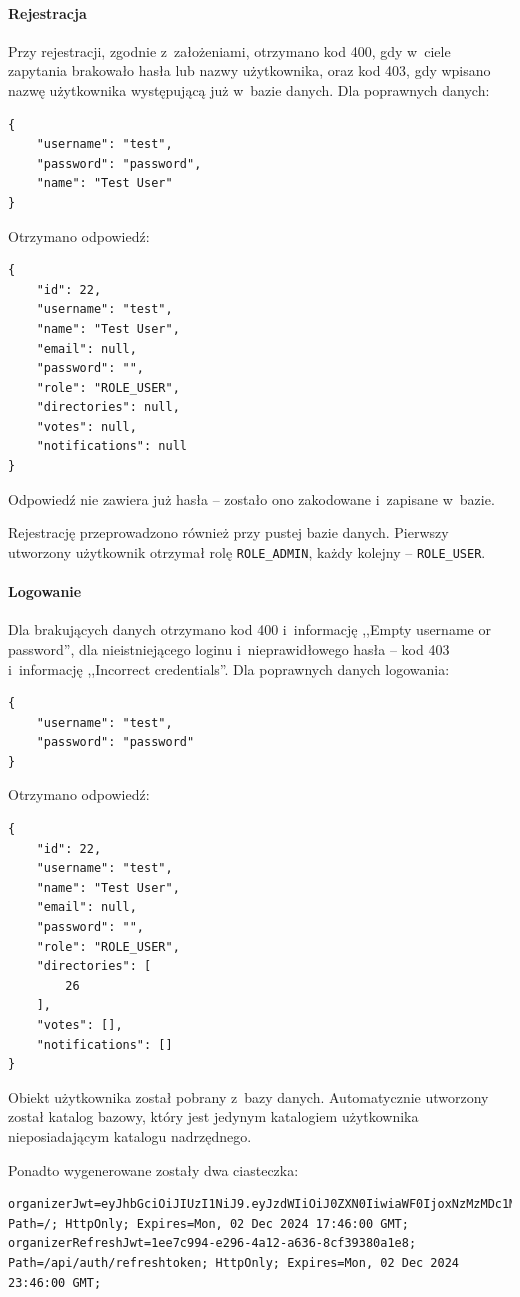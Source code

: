 \documentclass[a4paper,twoside,12pt]{book}
\begin{document}
\paragraph{Rejestracja}
Przy rejestracji, zgodnie z~założeniami, otrzymano kod 400, gdy w~ciele zapytania brakowało hasła lub nazwy użytkownika, oraz kod 403, gdy wpisano nazwę użytkownika występującą już w~bazie danych. Dla poprawnych danych:
\begin{verbatim}
{
	"username": "test",
	"password": "password",
	"name": "Test User"
}
\end{verbatim}
Otrzymano odpowiedź:
\begin{verbatim}
{
	"id": 22,
	"username": "test",
	"name": "Test User",
	"email": null,
	"password": "",
	"role": "ROLE_USER",
	"directories": null,
	"votes": null,
	"notifications": null
}
\end{verbatim}
Odpowiedź nie zawiera już hasła -- zostało ono zakodowane i~zapisane w~bazie.

Rejestrację przeprowadzono również przy pustej bazie danych. Pierwszy utworzony użytkownik otrzymał rolę \texttt{ROLE_ADMIN}, każdy kolejny -- \texttt{ROLE_USER}.

\paragraph{Logowanie}
Dla brakujących danych otrzymano kod 400 i~informację ,,Empty username or password'', dla nieistniejącego loginu i~nieprawidłowego hasła -- kod 403 i~informację ,,Incorrect credentials''. Dla poprawnych danych logowania:
\begin{verbatim}
{
	"username": "test",
	"password": "password"
}
\end{verbatim}
Otrzymano odpowiedź:
\begin{verbatim}
{
	"id": 22,
	"username": "test",
	"name": "Test User",
	"email": null,
	"password": "",
	"role": "ROLE_USER",
	"directories": [
		26
	],
	"votes": [],
	"notifications": []
}
\end{verbatim}
Obiekt użytkownika został pobrany z~bazy danych. Automatycznie utworzony został katalog bazowy, który jest jedynym katalogiem użytkownika nieposiadającym katalogu nadrzędnego.

Ponadto wygenerowane zostały dwa ciasteczka:
\begin{verbatim}
organizerJwt=eyJhbGciOiJIUzI1NiJ9.eyJzdWIiOiJ0ZXN0IiwiaWF0IjoxNzMzMDc1MTYxLCJleHAiOjE3MzMxNjE1NjF9.UOpUtCw0G1TgcEf9ufIk2T00JqQ8ARo61cZJnYslPdU; Path=/; HttpOnly; Expires=Mon, 02 Dec 2024 17:46:00 GMT;
organizerRefreshJwt=1ee7c994-e296-4a12-a636-8cf39380a1e8; Path=/api/auth/refreshtoken; HttpOnly; Expires=Mon, 02 Dec 2024 23:46:00 GMT;
\end{verbatim}
\end{document}
